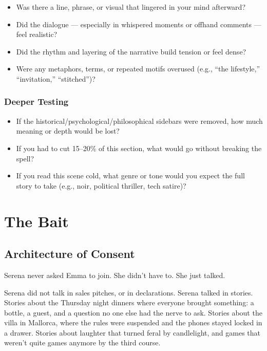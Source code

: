 \begin{itemize}
\item Was there a line, phrase, or visual that lingered in your mind afterward?
\item Did the dialogue — especially in whispered moments or offhand comments — feel realistic?
\item Did the rhythm and layering of the narrative build tension or feel dense?
\item Were any metaphors, terms, or repeated motifs overused (e.g., “the lifestyle,” “invitation,” “stitched”)?
\end{itemize}

\subsubsection{Deeper Testing}

\begin{itemize}
\item If the historical/psychological/philosophical sidebars were removed, how much meaning or depth would be lost?
\item If you had to cut 15–20\% of this section, what would go without breaking the spell?
\item If you read this scene cold, what genre or tone would you expect the full story to take (e.g., noir, political thriller, tech satire)?
\end{itemize}









\section{The Bait}

\subsection{Architecture of Consent}

Serena never asked Emma to join.  
She didn’t have to.
She just talked.

Serena did not talk in sales pitches, or in declarations. Serena talked in stories.  
Stories about the Thursday night dinners where everyone brought something: a bottle, a guest, 
and a question no one else had the nerve to ask.  
Stories about the villa in Mallorca, where the rules were suspended and the phones stayed locked in a drawer.  
Stories about laughter that turned feral by candlelight, and games that weren’t quite games anymore by the third course.

